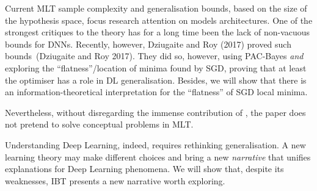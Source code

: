 \documentclass[
  letterpaper,
  12pt,
  british]{tufte-book}
\theoremstyle{plain}
\theoremstyle{definition}
\theoremstyle{plain}
\theoremstyle{remark}
\begin{document}
Current {MLT} sample complexity and generalisation bounds, based on the
size of the hypothesis space, focus research attention on models
architectures. One of the strongest critiques to the theory has for a
long time been the lack of non-vacuous bounds for {DNNs}. Recently,
however, Dziugaite and Roy
(2017)
proved such bounds~(Dziugaite and Roy
2017).
They did so, however, using PAC-Bayes \emph{and} exploring the
``flatness''/location of minima found by SGD, proving that at least the
optimiser has a role in {DL} generalisation. Besides, we will show that
there is an information-theoretical interpretation for the ``flatness''
of {SGD} local minima.

Nevertheless, without disregarding the immense contribution of , the
paper does not pretend to solve conceptual problems in {MLT}.

Understanding Deep Learning, indeed, requires rethinking generalisation.
A new learning theory may make different choices and bring a new
\emph{narrative} that unifies explanations for Deep Learning phenomena.
We will show that, despite its weaknesses, {IBT} presents a new
narrative worth exploring.



\backmatter
\end{document}
